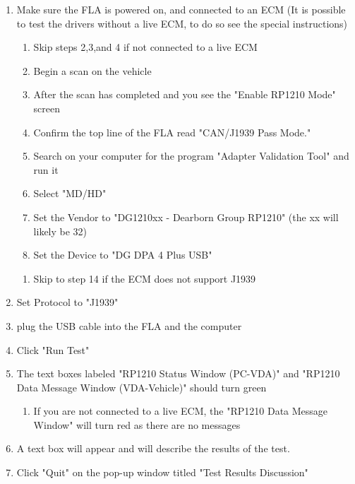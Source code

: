 \documentclass[11pt, oneside]{book}
\begin{document}
\begin{enumerate}
\item Make sure the FLA is powered on, and connected to an ECM (It is possible
to test the drivers without a live ECM, to do so see the special instructions)

\begin{enumerate}
\item Skip steps 2,3,and 4 if not connected to a live ECM
\item Begin a scan on the vehicle
\item After the scan has completed and you see the "Enable
RP1210 Mode" screen
\item Confirm the top line of the FLA read "CAN/J1939 Pass
Mode."
\item Search on your computer for the program "Adapter Validation
Tool" and run it
\item Select "MD/HD"
\item Set the Vendor to "DG1210xx - Dearborn Group RP1210"
(the xx will likely be 32)
\item Set the Device to "DG DPA 4 Plus USB"
\end{enumerate}

\begin{enumerate}
\item Skip to step 14 if the ECM does not support J1939
\end{enumerate}
\item Set Protocol to "J1939"
\item plug the USB cable into the FLA and the computer
\item Click "Run Test"
\item The text boxes labeled "RP1210 Status Window (PC-VDA)"
and "RP1210 Data Message Window (VDA-Vehicle)"
should turn green

\begin{enumerate}
\item If you are not connected to a live ECM, the "RP1210
Data Message Window" will turn red as there are no messages
\end{enumerate}
\item A text box will appear and will describe the results of the test.
\item Click "Quit" on the pop-up window titled
"Test Results Discussion"


\end{enumerate}
\end{document}
